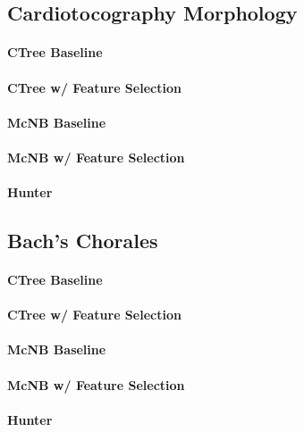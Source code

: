 \subsection{Cardiotocography Morphology}
\paragraph{CTree Baseline}
\paragraph{CTree w/ Feature Selection}
\paragraph{McNB Baseline}
\paragraph{McNB w/ Feature Selection}
\paragraph{Hunter}

\subsection{Bach's Chorales}
\paragraph{CTree Baseline}
\paragraph{CTree w/ Feature Selection}
\paragraph{McNB Baseline}
\paragraph{McNB w/ Feature Selection}
\paragraph{Hunter}


